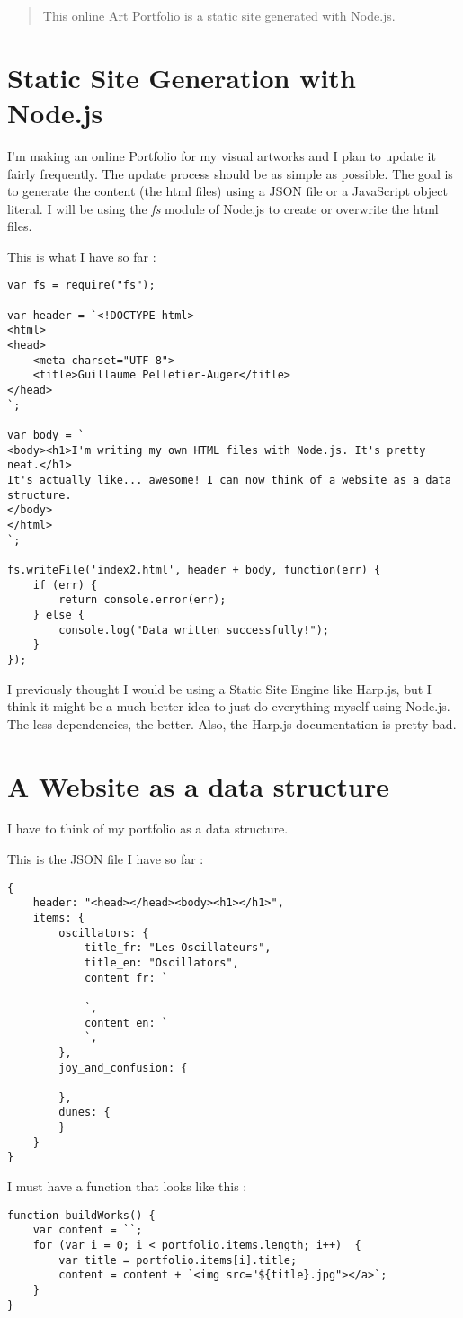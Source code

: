 
\begin{abstract}
This online Art Portfolio is a static site generated with Node.js.
\end{abstract}

\section{Static Site Generation with Node.js}
I'm making an online Portfolio for my visual artworks and I plan to update it fairly frequently. The update process should be as simple as possible. The goal is to generate the content (the html files) using a JSON file or a JavaScript object literal. I will be using the \textit{fs} module of Node.js to create or overwrite the html files.

This is what I have so far : 

\begin{lstlisting}
var fs = require("fs");

var header = `<!DOCTYPE html>
<html>
<head>
    <meta charset="UTF-8">
    <title>Guillaume Pelletier-Auger</title>
</head>
`;

var body = `
<body><h1>I'm writing my own HTML files with Node.js. It's pretty neat.</h1>
It's actually like... awesome! I can now think of a website as a data structure.
</body>
</html>
`;

fs.writeFile('index2.html', header + body, function(err) {
    if (err) {
        return console.error(err);
    } else {
        console.log("Data written successfully!");
    }
});

\end{lstlisting}

I previously thought I would be using a Static Site Engine like Harp.js, but I think it might be a much better idea to just do everything myself using Node.js. The less dependencies, the better. Also, the Harp.js documentation is pretty bad.


\section{A Website as a data structure}
I have to think of my portfolio as a data structure.

This is the JSON file I have so far :

\begin{lstlisting}
{
    header: "<head></head><body><h1></h1>",
    items: {
        oscillators: {
            title_fr: "Les Oscillateurs",
            title_en: "Oscillators",
            content_fr: `
            
            `,
            content_en: `
            `,
        },
        joy_and_confusion: {

        },
        dunes: {
        }
    }
}
\end{lstlisting}

I must have a function that looks like this :

\begin{lstlisting}
function buildWorks() {
    var content = ``;
    for (var i = 0; i < portfolio.items.length; i++)  {
        var title = portfolio.items[i].title;
        content = content + `<img src="${title}.jpg"></a>`;
    }
}
\end{lstlisting}